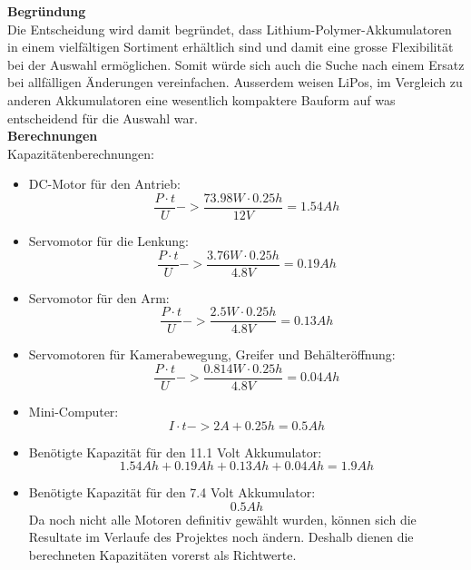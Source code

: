 \textbf{Begründung}\\[0.2cm]
Die Entscheidung wird damit begründet, dass Lithium-Polymer-Akkumulatoren in einem vielfältigen Sortiment erhältlich sind und damit eine grosse Flexibilität bei der Auswahl ermöglichen. Somit würde sich auch die Suche nach einem Ersatz bei allfälligen Änderungen vereinfachen. Ausserdem weisen LiPos, im Vergleich zu anderen Akkumulatoren eine wesentlich kompaktere Bauform auf was entscheidend für die Auswahl war. \\[0.2cm]
\textbf{Berechnungen}\\[0.2cm]
Kapazitätenberechnungen:
\begin{itemize}
\item DC-Motor für den Antrieb:
\[
\frac{P\cdot t}{U} -> \frac{73.98W\cdot0.25h}{12V}= 1.54 Ah
\]
\item Servomotor für die Lenkung:
\[
\frac{P\cdot t}{U} -> \frac{3.76W\cdot0.25h}{4.8V}= 0.19 Ah
\]
\item Servomotor für den Arm:
\[
\frac{P\cdot t}{U} -> \frac{2.5W\cdot0.25h}{4.8V}= 0.13 Ah
\]
\item Servomotoren für Kamerabewegung, Greifer und Behälteröffnung:
\[
\frac{P\cdot t}{U} -> \frac{0.814W\cdot0.25h}{4.8V}= 0.04 Ah
\]
\item Mini-Computer:
\[
I\cdot t -> 2A+0.25h = 0.5 Ah
\]
\item Benötigte Kapazität für den 11.1 Volt Akkumulator:
\[
1.54Ah+0.19Ah+0.13Ah+0.04Ah = 1.9Ah
\]
\item Benötigte Kapazität für den 7.4 Volt Akkumulator:
\[
0.5Ah
\]
Da noch nicht alle Motoren definitiv gewählt wurden, können sich die Resultate im Verlaufe des Projektes noch ändern. Deshalb dienen die berechneten Kapazitäten vorerst als Richtwerte.
\end{itemize}
